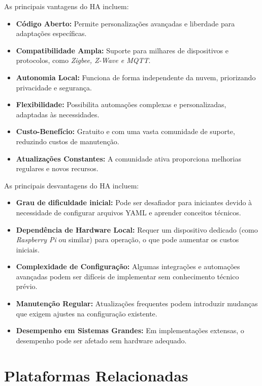 As principais vantagens do \gls{HA} incluem:

\begin{itemize}
    \item \textbf{Código Aberto:} Permite personalizações avançadas e liberdade para adaptações específicas.
    \item \textbf{Compatibilidade Ampla:} Suporte para milhares de dispositivos e protocolos, como \textit{Zigbee, Z-Wave e MQTT}.
    \item \textbf{Autonomia Local:} Funciona de forma independente da nuvem, priorizando privacidade e segurança.
    \item \textbf{Flexibilidade:} Possibilita automações complexas e personalizadas, adaptadas às necessidades.
    \item \textbf{Custo-Benefício:} Gratuito e com uma vasta comunidade de suporte, reduzindo custos de manutenção.
    \item \textbf{Atualizações Constantes:} A comunidade ativa proporciona melhorias regulares e novos recursos.
\end{itemize}

As principais desvantagens do \gls{HA} incluem:

\begin{itemize}
    \item \textbf{Grau de dificuldade inicial:} Pode ser desafiador para iniciantes devido à necessidade de configurar arquivos \gls{YAML} e aprender conceitos técnicos.
    \item \textbf{Dependência de Hardware Local:} Requer um dispositivo dedicado (como \textit{Raspberry Pi} ou similar) para operação, o que pode aumentar os custos iniciais.
    \item \textbf{Complexidade de Configuração:} Algumas integrações e automações avançadas podem ser difíceis de implementar sem conhecimento técnico prévio.
    \item \textbf{Manutenção Regular:} Atualizações frequentes podem introduzir mudanças que exigem ajustes na configuração existente.
    \item \textbf{Desempenho em Sistemas Grandes:} Em implementações extensas, o desempenho pode ser afetado sem hardware adequado.
\end{itemize}


\section{Plataformas Relacionadas}

